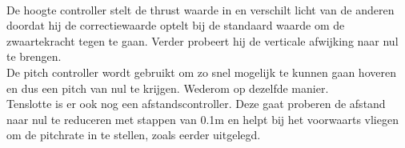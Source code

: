 \\
De hoogte controller stelt de thrust waarde in en verschilt licht van de anderen doordat hij de correctiewaarde optelt bij de standaard waarde om de zwaartekracht tegen te gaan. Verder probeert hij de verticale afwijking naar nul te brengen.
\\
De pitch controller wordt gebruikt om zo snel mogelijk te kunnen gaan hoveren en dus een pitch van nul te krijgen. Wederom op dezelfde manier.
\\
Tenslotte is er ook nog een afstandscontroller. Deze gaat proberen de afstand naar nul te reduceren met stappen van 0.1m en helpt bij het voorwaarts vliegen om de pitchrate in te stellen, zoals eerder uitgelegd.